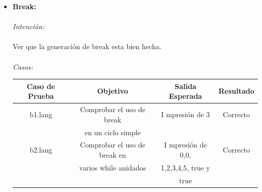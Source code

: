 \documentclass[11pt, spanish]{report}
\begin{document}
\begin{itemize}

\item \textbf{Break:}\\ \\
  \emph{Intenci\'on:}\\ \\
  Ver que la generaci\'on de break esta bien hecha.\\ \\
  \emph{Casos:}\\ 
  \begin{table}[!hbp]
    \begin{tabular}{c c c c}
      \hline            
      \hline            
      Caso de Prueba & Objetivo                       & Salida Esperada      & Resultado \\ [0.5ex]
      \hline                          
      b1.lang        & Comprobar el uso de break      & I mpresi\'on de 3    & Correcto  \\ [1ex] 
                     & en un ciclo simple             &                      &           \\ [1ex] 
      b2.lang        & Comprobar el uso de break en   & I mpresi\'on de 0,0, & Correcto  \\ [1ex] 
                     & varios while anidados          & 1,2,3,4,5, true y    &           \\ [1ex] 
                     &                                & true                 &           \\ [1ex] 
      \hline
    \end{tabular}    
  \end{table}



\end{itemize}
\end{document}
